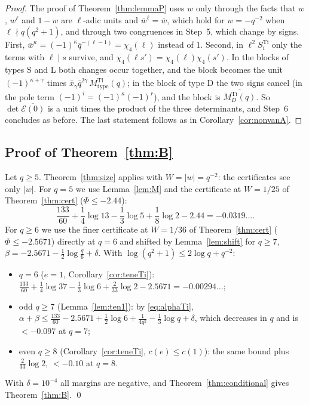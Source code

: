\documentclass[11pt]{amsart}
\theoremstyle{definition}
\theoremstyle{remark}
\numberwithin{equation}{section}
\newcommand{\Ti}{\operatorname{Ti}}
\begin{document}
\begin{proof}
The proof of Theorem~\ref{thm:lemmaP} uses $w$ only through the facts that $w$, $w^\ell$ and $1-w$ are $\ell$-adic units
and $\bar w^\ell=\bar w$, which hold for $w=-q^{-2}$ when $\ell\nmid q(q^2+1)$, and through two congruences in Step~5,
which change by signs. First, $\bar w^\kappa=(-1)^\kappa\bar q^{-(\ell-1)}=\chi_4(\ell)$ instead of $1$. Second, in
$\ell^2S^{\Ti}_i$ only the terms with $\ell\mid s$ survive, and $\chi_4(\ell s')=\chi_4(\ell)\chi_4(s')$. In the blocks of
types S and L both changes occur together, and the block becomes the unit $(-1)^{\kappa+\gamma}$ times
$\bar x_\gamma\bar q^{2\gamma}\,\overline{M^{\Ti}_{\mathrm{type}}(q)}$; in the block of type D the two signs cancel (in the pole
term $(-1)^i=(-1)^\kappa(-1)^r$), and the block is $\overline{M^{\Ti}_D(q)}$. So $\det\overline{\mathcal E(0)}$ is a unit
times the product of the three determinants, and Step~6 concludes as before. The last statement follows as in
Corollary~\ref{cor:nonvanA}.
\end{proof}

\subsection{Proof of Theorem~\ref{thm:B}}
Let $q\ge5$. Theorem~\ref{thm:size} applies with $W=|w|=q^{-2}$: the certificates see only $|w|$. For $q=5$ we use
Lemma~\ref{lem:M} and the certificate at $W=1/25$ of Theorem~\ref{thm:cert} ($\Phi\le-2.44$):
\[
  \frac{133}{60}+\frac14\log13-\frac13\log5+\frac18\log2-2.44=-0.0319\ldots .
\]
For $q\ge6$ we use the finer
certificate at $W=1/36$ of Theorem~\ref{thm:cert} ($\Phi\le-2.5671$) directly at $q=6$ and shifted by
Lemma~\ref{lem:shift} for $q\ge7$, $\beta=-2.5671-\frac12\log\frac q6+\delta$. With $\log(q^2+1)\le2\log q+q^{-2}$:
\begin{itemize}
\item $q=6$ ($e=1$, Corollary~\ref{cor:teneTi}): $\frac{133}{60}+\frac14\log37-\frac13\log6+\frac2{33}\log2-2.5671=-0.00294\ldots$;
\item odd $q\ge7$ (Lemma~\ref{lem:ten1}): by \eqref{eq:alphaTi},
  $\alpha+\beta\le\frac{133}{60}-2.5671+\frac12\log6+\frac1{4q^2}-\frac13\log q+\delta$, which decreases in $q$ and is
  $<-0.097$ at $q=7$;
\item even $q\ge8$ (Corollary~\ref{cor:teneTi}, $c(e)\le c(1)$): the same bound plus $\frac2{33}\log2$, $<-0.10$ at
  $q=8$.
\end{itemize}
With $\delta=10^{-4}$ all margins are negative, and Theorem~\ref{thm:conditional} gives Theorem~\ref{thm:B}. \qed
\end{document}
